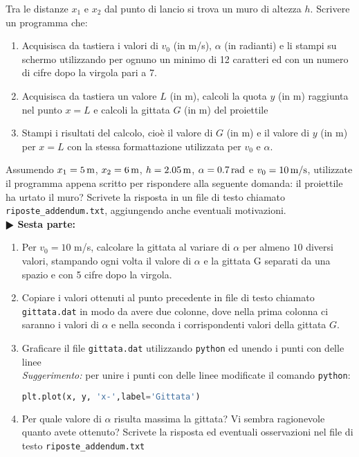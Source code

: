 \documentclass[11pt]{article}
\begin{document}
Tra le distanze $x_1$ e $x_2$ dal punto di lancio si trova un muro di altezza $h$.
Scrivere un programma che:
\begin{enumerate}
  \item Acquisisca da tastiera i valori di $v_0$ (in m/s), $\alpha$ (in radianti) e li stampi su schermo utilizzando per ognuno un minimo di 12 caratteri ed con un numero di cifre dopo la virgola pari a 7. 
  \item Acquisisca da tastiera un valore $L$ (in m), calcoli la quota $y$ (in m) raggiunta nel punto $x = L$ e
    calcoli la gittata $G$ (in m) del proiettile
  \item Stampi i risultati del calcolo, cioè il valore di $G$ (in m) e il valore di $y$ (in m) per $x=L$ 
        con la stessa formattazione utilizzata per $v_0$ e $\alpha$.
\end{enumerate}
Assumendo $x_1=5\,\hbox{m}$, $x_2=6\,\hbox{m}$, $h=2.05\,\hbox{m}$, $\alpha=0.7\,\hbox{rad}$ e $v_0=10\,\hbox{m/s}$,
utilizzate il programma appena scritto per rispondere alla seguente domanda: il proiettile ha urtato il muro? 
Scrivete la risposta in un file di testo chiamato \texttt{riposte\_addendum.txt}, aggiungendo anche eventuali motivazioni.
\vspace{3mm} \\
\textbf{$\RHD$ Sesta parte:} 
\begin{enumerate}
  \item Per $v_0=10$ m/s, calcolare la gittata al variare di $\alpha$ per almeno $10$ diversi valori, stampando 
   ogni volta il valore di $\alpha$ e la gittata G separati da una spazio e con 5 cifre dopo la virgola.
  
 \item Copiare i valori ottenuti al punto precedente in file di testo chiamato \texttt{gittata.dat} 
     in modo da avere due colonne, dove nella prima colonna ci saranno i valori di $\alpha$ 
      e nella seconda i corrispondenti valori della gittata $G$.

    \item Graficare il file \texttt{gittata.dat} utilizzando \texttt{python} ed unendo i punti con delle linee \\
    {\em Suggerimento:\/} per unire i punti con delle linee modificate il comando \texttt{python}:
    \vspace{0.2cm}
\begin{lstlisting}[language=Python,numbers=none]
  plt.plot(x, y, 'x-',label='Gittata')
\end{lstlisting}
 \item Per quale valore di $\alpha$ risulta massima la gittata? Vi sembra ragionevole quanto avete ottenuto?
      Scrivete la risposta ed eventuali osservazioni nel file di testo \texttt{riposte\_addendum.txt}
\end{enumerate}  
\end{document}
